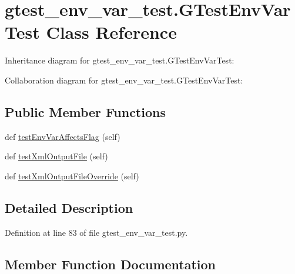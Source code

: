 \hypertarget{classgtest__env__var__test_1_1_g_test_env_var_test}{}\section{gtest\+\_\+env\+\_\+var\+\_\+test.\+G\+Test\+Env\+Var\+Test Class Reference}
\label{classgtest__env__var__test_1_1_g_test_env_var_test}


Inheritance diagram for gtest\+\_\+env\+\_\+var\+\_\+test.\+G\+Test\+Env\+Var\+Test\+:


Collaboration diagram for gtest\+\_\+env\+\_\+var\+\_\+test.\+G\+Test\+Env\+Var\+Test\+:
\subsection*{Public Member Functions}
\begin{DoxyCompactItemize}
\item 
def \hyperlink{classgtest__env__var__test_1_1_g_test_env_var_test_ad169061caa22a6cd510535d6da94b97e}{test\+Env\+Var\+Affects\+Flag} (self)
\item 
def \hyperlink{classgtest__env__var__test_1_1_g_test_env_var_test_ae2f623209c115e094965e606cd34eec4}{test\+Xml\+Output\+File} (self)
\item 
def \hyperlink{classgtest__env__var__test_1_1_g_test_env_var_test_ae41b9b9569eb327d5886cb811c2995a7}{test\+Xml\+Output\+File\+Override} (self)
\end{DoxyCompactItemize}


\subsection{Detailed Description}


Definition at line 83 of file gtest\+\_\+env\+\_\+var\+\_\+test.\+py.



\subsection{Member Function Documentation}
